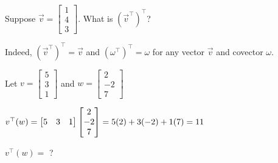 \documentclass{ximera}
\begin{document}
\begin{question}
  Suppose $\vec{v} = \begin{bmatrix} 1 \\ 4 \\ 3 \end{bmatrix}$.  What is $(\vec{v}^\top)^\top$?

  \begin{solution}
    \begin{multiple-choice}
    \end{multiple-choice}
  \end{solution}

  Indeed, $(\vec{v}^\top)^\top = \vec{v}$ and $(\omega^\top)^\top = \omega$ for any vector $\vec{v}$ and covector $\omega$.

  Let $v = \begin{bmatrix}  5 \\ 3 \\ 1\end{bmatrix}$ and $w = \begin{bmatrix}  2 \\ -2 \\ 7\end{bmatrix}$ 
  \begin{solution}
    \begin{hint}
      $v^\top(w) = \begin{bmatrix} 5 & 3 & 1\end{bmatrix} \begin{bmatrix}2\\-2\\7\end{bmatrix} = 5(2)+3(-2)+1(7) = 11$
    \end{hint}
    $v^\top(w)=$ ?
  \end{solution}


\end{question}
\end{document}
